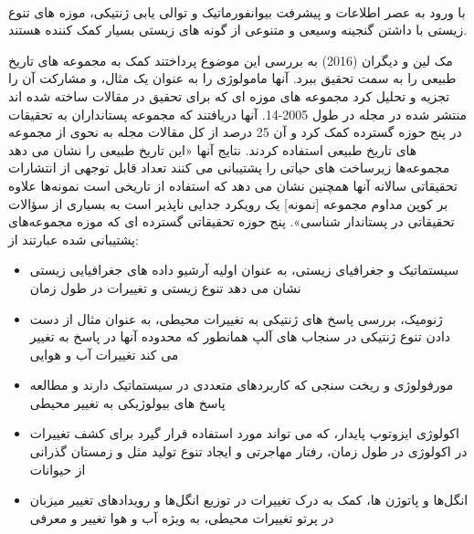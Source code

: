 

\paragraph*{}

با ورود به عصر اطلاعات و پیشرفت بیوانفورماتیک و توالی یابی ژنتیکی، موزه های تنوع زیستی با داشتن گنجینه وسیعی و متنوعی از گونه های زیستی بسیار کمک کننده هستند.

مک لین و دیگران (2016) به بررسی این موضوع پرداختند کمک به مجموعه های تاریخ طبیعی را به سمت تحقیق ببرد. آنها مامولوژی را به عنوان یک مثال، و مشارکت آن را تجزیه و تحلیل کرد مجموعه های موزه ای که برای تحقیق در مقالات ساخته شده اند منتشر شده در مجله  در طول 2005-14. آنها دریافتند که مجموعه پستانداران به تحقیقات در پنج حوزه گسترده کمک کرد و آن 25 درصد از کل مقالات مجله  به نحوی از مجموعه های تاریخ طبیعی استفاده کردند. نتایج آنها «این تاریخ طبیعی را نشان می دهد مجموعه‌ها زیرساخت های حیاتی را پشتیبانی می کنند تعداد قابل توجهی از انتشارات تحقیقاتی سالانه آنها همچنین نشان می دهد که استفاده از تاریخی است نمونه‌ها علاوه بر کوپن مداوم مجموعه [نمونه] یک رویکرد جدایی ناپذیر است به بسیاری از سؤالات تحقیقاتی در پستاندار شناسی».
پنج حوزه تحقیقاتی گسترده ای که موزه مجموعه‌های پشتیبانی شده عبارتند از: 
\begin{itemize}
    \item     سیستماتیک و جغرافیای زیستی، به عنوان اولیه آرشیو داده های جغرافیایی زیستی نشان می دهد تنوع زیستی و تغییرات در طول زمان
    \item    ژنومیک، بررسی پاسخ های ژنتیکی به تغییرات محیطی، به عنوان مثال از دست دادن تنوع ژنتیکی در سنجاب های آلپ همانطور که محدوده آنها در پاسخ به تغییر می کند تغییرات آب و هوایی 
    \item    مورفولوژی و ریخت سنجی که کاربردهای متعددی در سیستماتیک دارند و مطالعه پاسخ های بیولوژیکی به تغییر محیطی
    \item    اکولوژی ایزوتوپ پایدار، که می تواند مورد استفاده قرار گیرد برای کشف تغییرات در اکولوژی در طول زمان، رفتار مهاجرتی و ایجاد تنوع تولید مثل و زمستان گذرانی از حیوانات 
    \item    انگل‌ها و پاتوژن ها، کمک به درک تغییرات در توزیع انگل‌ها و رویدادهای تغییر میزبان در پرتو تغییرات محیطی، به ویژه آب و هوا تغییر و معرفی
\end{itemize}

